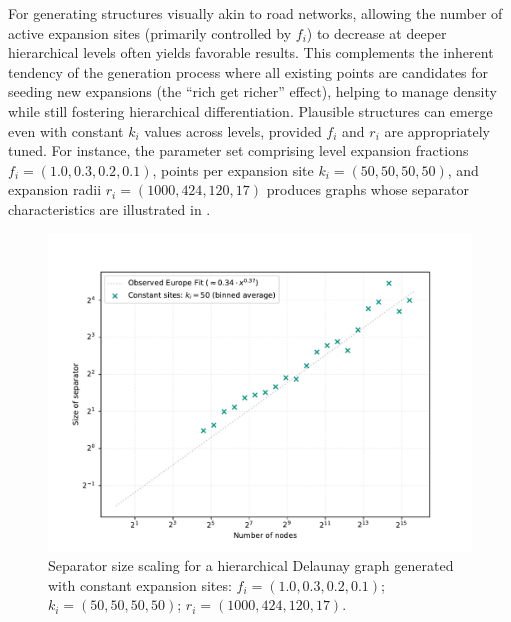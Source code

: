 For generating structures visually akin to road networks, allowing the number of active expansion sites (primarily controlled by \(f_i\)) to decrease at deeper hierarchical levels often yields favorable results.
This complements the inherent tendency of the generation process where all existing points are candidates for seeding new expansions (the \enquote{rich get richer} effect), helping to manage density while still fostering hierarchical differentiation.
Plausible structures can emerge even with constant \(k_i\) values across levels, provided \(f_i\) and \(r_i\) are appropriately tuned.
For instance, the parameter set comprising level expansion fractions \(f_i = (1.0, 0.3, 0.2, 0.1)\), points per expansion site \(k_i = (50, 50, 50, 50)\), and expansion radii \(r_i = (1000, 424, 120, 17)\) produces graphs whose separator characteristics are illustrated in .

\begin{figure}[tbhp]
	\centering
	\includegraphics[width=0.7\linewidth]{graphics/hierachcial_delaunay_const_sites.pdf}
	\caption{Separator size scaling for a hierarchical Delaunay graph generated with constant expansion sites: \(f_i=(1.0, 0.3, 0.2, 0.1)\); \(k_i=(50, 50, 50, 50)\); \(r_i=(1000, 424, 120, 17)\).}
	\label{fig:hier_delaunay_example_params_sep}
\end{figure}

